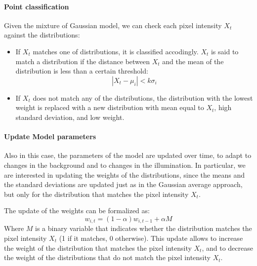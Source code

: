 \paragraph{Point classification}
Given the mixture of Gaussian model, we can check each pixel intensity $X_t$ against the distributions:
\begin{itemize}
    \item If $X_t$ matches one of distributions, it is classified accodingly.
    $X_t$ is said to match a distribution if the distance between $X_t$ and the mean of the distribution is less than a certain threshold:
    \begin{equation*}
        |X_t - \mu_i| < k \sigma_i
    \end{equation*}
    \item If $X_t$ does not match any of the distributions, the distribution with the lowest weight is replaced
    with a new distribution with mean equal to $X_t$, high standard deviation, and low weight.
\end{itemize}

\paragraph{Update Model parameters}
Also in this case, the parameters of the model are updated over time, to adapt to changes in the background and to changes in the illumination.
In particular, we are interested in updating the weights of the distributions, since the means and the standard deviations are updated just as in the 
Gaussian average approach, but only for the distribution that matches the pixel intensity $X_t$.

The update of the weights can be formalized as:
\begin{equation}
    w_{i,t} = (1 - \alpha) w_{i,t-1} + \alpha M
\end{equation}
Where $M$ is a binary variable that indicates whether the distribution matches the pixel intensity $X_t$ (1 if it matches, 0 otherwise).
This update allows to increase the weight of the distribution that matches the pixel intensity $X_t$, 
and to decrease the weight of the distributions that do not match the pixel intensity $X_t$.